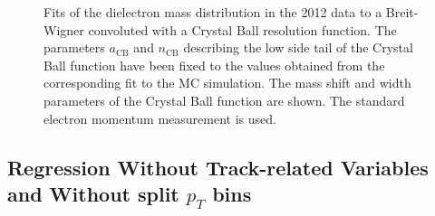 \documentclass{cmspaper}
\begin{document}
\begin{figure}[h]
\centering
	\caption{Fits of the dielectron mass distribution in the 2012 data to
        a Breit-Wigner convoluted with a Crystal Ball resolution function. The parameters $a_{\mathrm{CB}}$ 
        and $n_{\mathrm{CB}}$ describing the low side tail of the Crystal Ball function have been fixed to the values
        obtained from the corresponding fit to the MC simulation. The mass shift and width parameters 
        of the Crystal Ball function are shown. The standard electron momentum measurement is 
        used.}
	\label{fig:ZMassFit_2012Data_Standard}
\end{figure}
 
\clearpage

\subsection{Regression Without Track-related Variables and Without split $p_{T}$ bins }
\end{document}
